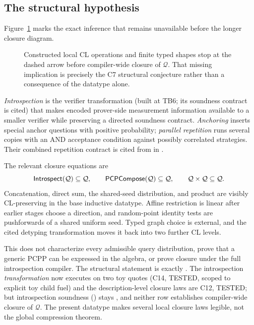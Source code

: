 \subsection{The structural hypothesis}

Figure~\ref{fig:D-closure-gap} marks the exact inference that remains
unavailable before the longer closure diagram.
\begin{figure}[H]
\centering

\caption{Constructed local CL operations and finite typed shapes stop at the dashed arrow before compiler-wide closure of \(\mathcal Q\).  That missing implication is precisely the C7 structural conjecture rather than a consequence of the datatype alone.}
\label{fig:D-closure-gap}
\end{figure}

\emph{Introspection} is the verifier transformation (built at TB6; its
soundness contract is cited) that makes encoded prover-side measurement
information available to a smaller verifier while preserving a directed
soundness contract.
\emph{Anchoring} inserts special anchor questions with positive probability;
\emph{parallel repetition} runs several copies with an AND acceptance
condition against possibly correlated strategies.  Their combined repetition
contract is cited from  in
.

The relevant closure equations are
\[
 \mathsf{Introspect}(\mathcal Q)\subseteq\mathcal Q,
 \qquad \mathsf{PCPCompose}(\mathcal Q)\subseteq\mathcal Q,
 \qquad \mathcal Q\times\mathcal Q\subseteq\mathcal Q.
\]
Concatenation, direct sum, the shared-seed distribution, and product are visibly
CL-preserving in the base inductive datatype.  Affine restriction is linear
after earlier stages choose a direction, and random-point identity tests are
pushforwards of a shared uniform seed.  Typed graph choice is external, and the
cited detyping transformation moves it back into two further CL levels.

This does not characterize every admissible query distribution, prove that a
generic PCPP can be expressed in the algebra, or prove closure under the full
introspection compiler.  The structural statement is exactly
.  The introspection \emph{transformation} now executes
on two toy quotes (C14, \textsc{TESTED}, scoped to explicit toy child fuel)
and the description-level closure laws are C12, \textsc{TESTED}; but
introspection soundness () stays , and
neither row establishes compiler-wide closure of \(\mathcal Q\).  The present
datatype makes several local closure laws legible, not the global compression
theorem.

